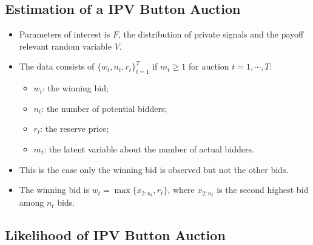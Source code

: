 \documentclass[]{book}
\providecommand{\tightlist}{%
  \setlength{\itemsep}{0pt}\setlength{\parskip}{0pt}}
\begin{document}
\subsection{Estimation of a IPV Button
Auction}\label{estimation-of-a-ipv-button-auction}

\begin{itemize}
\tightlist
\item
  Parameters of interest is \(F\), the distribution of private signals
  and the payoff relevant random variable \(V\).
\item
  The data consists of \(\{w_t, n_t, r_t\}_{t = 1}^T\) if \(m_t \ge 1\)
  for auction \(t = 1, \cdots, T\):

  \begin{itemize}
  \tightlist
  \item
    \(w_t\): the winning bid;
  \item
    \(n_t\): the number of potential bidders;
  \item
    \(r_t\): the reserve price;
  \item
    \(m_t\): the latent variable about the number of actual bidders.
  \end{itemize}
\item
  This is the case only the winning bid is observed but not the other
  bids.
\item
  The winning bid is \(w_t = \max\{x_{2:n_t}, r_t\}\), where
  \(x_{2:n_t}\) is the second highest bid among \(n_t\) bids.
\end{itemize}

\subsection{Likelihood of IPV Button
Auction}\label{likelihood-of-ipv-button-auction}
\end{document}
